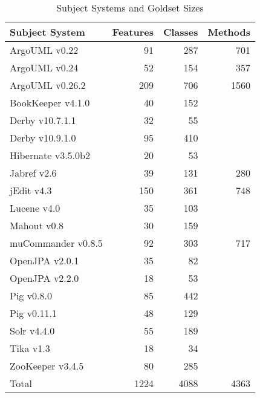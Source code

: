 \begin{table}[t]
\renewcommand{\arraystretch}{1.3}
\footnotesize
\centering
\caption{Subject Systems and Goldset Sizes}
\begin{tabular}{lrrr}
    \toprule
    Subject System     & Features & Classes & Methods \\
    \midrule
    ArgoUML v0.22      & 91       & 287     & 701     \\
    ArgoUML v0.24      & 52       & 154     & 357     \\
    ArgoUML v0.26.2    & 209      & 706     & 1560    \\
    BookKeeper v4.1.0  & 40       & 152     &         \\
    Derby v10.7.1.1    & 32       & 55      &         \\
    Derby v10.9.1.0    & 95       & 410     &         \\
    Hibernate v3.5.0b2 & 20       & 53      &         \\
    Jabref v2.6        & 39       & 131     & 280     \\
    jEdit v4.3         & 150      & 361     & 748     \\
    Lucene v4.0        & 35       & 103     &         \\
    Mahout v0.8        & 30       & 159     &         \\
    muCommander v0.8.5 & 92       & 303     & 717     \\
    OpenJPA v2.0.1     & 35       & 82      &         \\
    OpenJPA v2.2.0     & 18       & 53      &         \\
    Pig v0.8.0         & 85       & 442     &         \\
    Pig v0.11.1        & 48       & 129     &         \\
    Solr v4.4.0        & 55       & 189     &         \\
    Tika v1.3          & 18       & 34      &         \\
    ZooKeeper v3.4.5   & 80       & 285     &         \\
    \midrule
    Total              & 1224     & 4088    & 4363    \\
    \bottomrule
\end{tabular}
\label{table:subjects}
\end{table}

